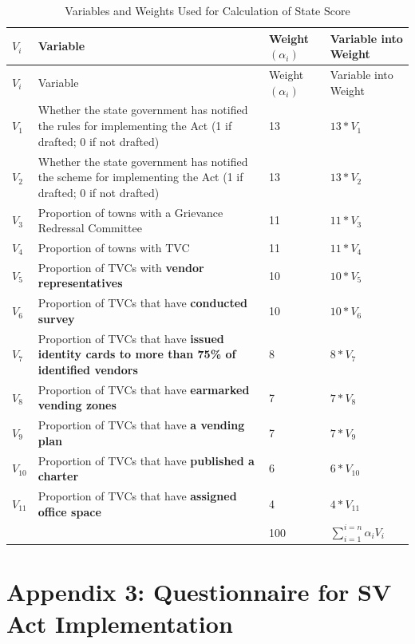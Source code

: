 \documentclass[a4paper, 12pt, twoside]{article}
\begin{document}
{{%
\begin{longtable}[l]{>{\raggedright}p{1.5cm}>{\raggedright}p{6cm}>{\raggedright}p{2.5cm}>{\raggedright\arraybackslash}p{4cm}}
  \caption{Variables and Weights Used for Calculation of State Score}\\
    \toprule
$V_i$ & Variable & Weight $(\alpha_i)$ & Variable into Weight \\
\midrule
\endfirsthead
$V_i$ & Variable & Weight $(\alpha_i)$ & Variable into Weight \\
\midrule
\endhead
\bottomrule
\endfoot
\bottomrule
\endlastfoot
$V_1$ & Whether the state government has notified the rules for implementing the Act (1 if drafted; 0 if not drafted) & 13 & $13 * V_1$\\
$V_2$ & Whether the state government has notified the scheme for implementing the Act (1 if drafted; 0 if not drafted) & 13 & $13 * V_2$\\
$V_3$ & Proportion of towns with a Grievance Redressal Committee & 11 & $11 * V_3$\\
$V_4$ & Proportion of towns with TVC & 11 & $11 * V_4$\\
$V_5$ & Proportion of TVCs with \textbf{vendor representatives} & 10 & $10 * V_5$\\
$V_6$ & Proportion of TVCs that have \textbf{conducted survey} & 10 & $10 * V_6$\\
$V_7$ & Proportion of TVCs that have \textbf{issued identity cards to more than 75\% of identified vendors} & 8 & $8 * V_7$\\
$V_8$ & Proportion of TVCs that have \textbf{earmarked vending zones} & 7 & $7 * V_8$\\
$V_9$ & Proportion of TVCs that have \textbf{a vending plan} & 7 & $7 * V_9$\\
$V_{10}$ & Proportion of TVCs that have \textbf{published a charter} & 6 & $6 * V_{10}$\\
$V_{11}$ & Proportion of TVCs that have \textbf{assigned office space} & 4 & $4 * V_{11}$\\
\midrule
& & 100 & $\sum_{i = 1}^{i = n} \alpha_i V_i$\\
\end{longtable}

\newpage
\section*{Appendix 3: Questionnaire for SV Act Implementation}
\label{sec: Appendix 5}

}}
\end{document}
